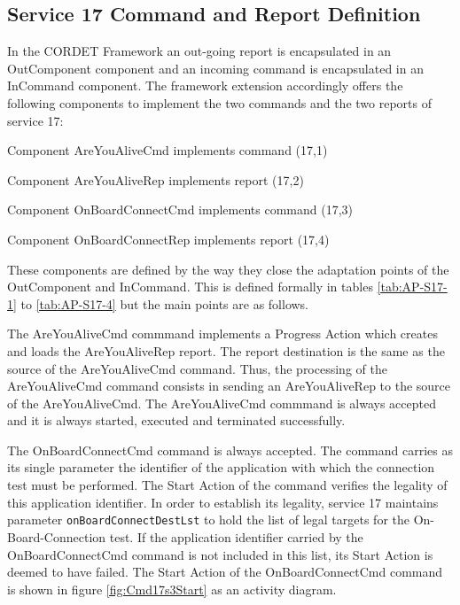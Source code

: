 \documentclass[a4paper,10pt]{article}
\newenvironment{fw_itemize}						%
{\begin{itemize}
  \setlength{\itemsep}{1mm}
  \setlength{\parskip}{0pt}
  \setlength{\parsep}{0pt}}
{\end{itemize}}
\begin{document}
\subsection{Service 17 Command and Report Definition}
In the CORDET Framework an out-going report is encapsulated in an OutComponent component and an incoming command is encapsulated in an InCommand component. The framework extension accordingly offers the following components to implement the two commands and the two reports of service 17:

\begin{fw_itemize}
\item Component AreYouAliveCmd implements command (17,1) 
\item Component AreYouAliveRep implements report (17,2) 
\item Component OnBoardConnectCmd implements command (17,3)  
\item Component OnBoardConnectRep implements report (17,4) 
\end{fw_itemize}

These components are defined by the way they close the adaptation points of the OutComponent and InCommand. This is defined formally in tables \ref{tab:AP-S17-1} to \ref{tab:AP-S17-4} but the main points are as follows.

The AreYouAliveCmd commmand implements a Progress Action which creates and loads the AreYouAliveRep report. The report destination is the same as the source of the AreYouAliveCmd command. Thus, the processing of the AreYouAliveCmd command consists in sending an AreYouAliveRep to the source of the AreYouAliveCmd. The AreYouAliveCmd commmand is always accepted and it is always started, executed and terminated successfully.

The OnBoardConnectCmd command is always accepted. The command carries as its single parameter the identifier of the application with which the connection test must be performed. The Start Action of the command verifies the legality of this application identifier. In order to establish its legality, service 17 maintains parameter \texttt{onBoardConnectDestLst} to hold the list of legal targets for the On-Board-Connection test. If the application identifier carried by the OnBoardConnectCmd command is not included in this list, its Start Action is deemed to have failed. The Start Action of the OnBoardConnectCmd command is shown in figure \ref{fig:Cmd17s3Start} as an activity diagram.
\end{document}
